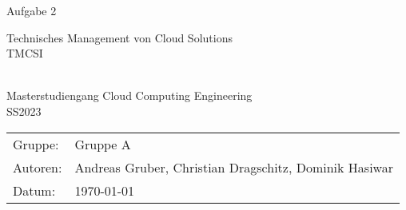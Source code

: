 \begin{titlepage}
	\thispagestyle{scrheadings}
	\ofoot{}
\noindent
\vspace*{1cm}


\begin{center}  %
	\huge{Aufgabe 2}

    \vspace{3cm}

    \large{
    	Technisches Management von Cloud Solutions\\
        TMCSI
          }
         
        \large{	~\newline \newline
        \\Masterstudiengang Cloud Computing Engineering \\
        SS2023
        }
  
\end{center}
\vspace{1cm}

\noindent\begin{tabular}{@{}ll}


Gruppe:
&
Gruppe A
\\
Autoren:
&
Andreas Gruber, Christian Dragschitz, Dominik Hasiwar
\\
Datum:
&
\today
\end{tabular}

\end{titlepage}
